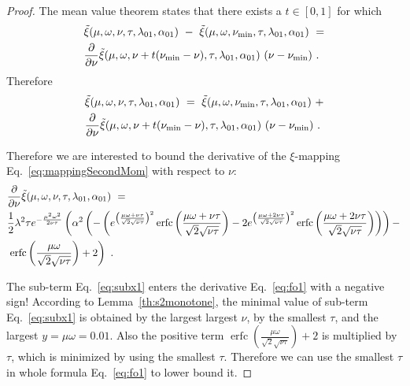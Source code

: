 \documentclass{article}
\newcommand\xinn{{\tilde \xi}}
\DeclareMathOperator{\erfc}{erfc}
\begin{document}
\begin{proof}
The mean value theorem states that there exists a $t\in [0,1]$  for which
\begin{align}
&\xinn(\mu,\omega,\nu,\tau,\lambda_{\rm 01},\alpha_{\rm 01})
  \ - \
  \xinn(\mu,\omega,\nu_{\mathrm{min}},\tau,\lambda_{\rm 01},\alpha_{\rm 01})
\ = \\\nonumber &\frac{\partial }{\partial \nu}
  \xinn(\mu,\omega,\nu+t(\nu_{\mathrm{min}}-\nu),\tau,\lambda_{\rm 01},\alpha_{\rm 01})
  \ (\nu-\nu_{\mathrm{min}}) \ .
\end{align}
Therefore
\begin{align}
&\xinn(\mu,\omega,\nu,\tau,\lambda_{\rm 01},\alpha_{\rm 01})
  \ = \ \xinn(\mu,\omega,\nu_{\mathrm{min}},\tau,\lambda_{\rm 01},\alpha_{\rm 01})
\ + \\ \nonumber &\frac{\partial }{\partial \nu}
  \xinn(\mu,\omega,\nu+t(\nu_{\mathrm{min}}-\nu),\tau,\lambda_{\rm 01},\alpha_{\rm 01})
  \ (\nu-\nu_{\mathrm{min}}) \ .
\end{align}

Therefore we are interested to bound the derivative of the $\xi$-mapping
Eq.~\eqref{eq:mappingSecondMom} with respect to  $\nu$:
\begin{align}
\label{eq:fo1}
&\frac{\partial }{\partial \nu}
  \xinn(\mu,\omega,\nu,\tau,\lambda_{\rm 01},\alpha_{\rm 01})\
  = \\\nonumber
&\frac{1}{2} \lambda ^2  \tau e^{-\frac{\mu^2 \omega^2}{2  \nu \tau}} 
\left(\alpha ^2 \left(-\left(e^{\left(\frac{\mu \omega+\nu \tau}{\sqrt{2} \sqrt{\nu \tau}}\right)^2} \erfc \left(\frac{\mu \omega+\nu \tau}{\sqrt{2} \sqrt{\nu \tau}}\right)-
2 e^{\left(\frac{\mu \omega+2  \nu \tau}{\sqrt{2} \sqrt{\nu \tau}}\right)^2} \erfc \left(\frac{\mu \omega+2  \nu \tau}{\sqrt{2} \sqrt{\nu \tau}}\right)\right)\right)-
\right.\\\nonumber &\left.\erfc \left(\frac{\mu \omega}{\sqrt{2} \sqrt{\nu \tau}}\right)+2\right) \ .
\end{align}


The sub-term Eq.~\eqref{eq:subx1} enters the derivative
Eq.~\eqref{eq:fo1} with a negative sign!
According to Lemma~\ref{th:s2monotone},
the minimal value of sub-term Eq.~\eqref{eq:subx1}
is obtained by the largest largest  $\nu$, 
by the smallest $\tau$, and the largest $y=\mu \omega=0.01$.
Also the positive term
$\erfc \left(\frac{\mu \omega}{\sqrt{2} \sqrt{\nu
\tau}}\right)+2$ is multiplied by $\tau$, which is minimized
by using the smallest $\tau$.
Therefore we can use the smallest  $\tau$ in whole formula
Eq.~\eqref{eq:fo1} to lower bound it. 



\end{proof}
\end{document}
